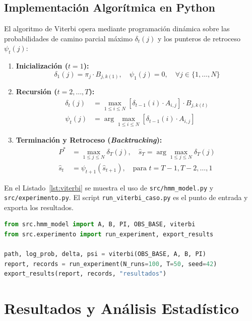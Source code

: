 \documentclass[11pt,a4paper]{article}
\begin{document}
\subsection{Implementación Algorítmica en Python}

El algoritmo de Viterbi opera mediante programación dinámica sobre las probabilidades de camino parcial máximo $\delta_t(j)$ y los punteros de retroceso $\psi_t(j)$:
\begin{enumerate}
    \item \textbf{Inicialización ($t = 1$):}
    \begin{equation}
    \delta_1(j) = \pi_j \cdot B_{j, k(1)}, \quad \psi_1(j) = 0, \quad \forall j \in \{1, \dots, N\}
    \end{equation}
    \item \textbf{Recursión ($t = 2, \dots, T$):}
    \begin{align}
    \delta_t(j) &= \max_{1 \le i \le N} \left[ \delta_{t-1}(i) \cdot A_{i,j} \right] \cdot B_{j, k(t)} \\
    \psi_t(j) &= \arg\max_{1 \le i \le N} \left[ \delta_{t-1}(i) \cdot A_{i,j} \right]
    \end{align}
    \item \textbf{Terminación y Retroceso (\textit{Backtracking}):}
    \begin{align}
    P^* &= \max_{1 \le j \le N} \delta_T(j), \quad \hat{s}_T = \arg\max_{1 \le j \le N} \delta_T(j) \\
    \hat{s}_t &= \psi_{t+1}(\hat{s}_{t+1}), \quad \text{para } t = T-1, T-2, \dots, 1
    \end{align}
\end{enumerate}

En el Listado~\ref{lst:viterbi} se muestra el uso de \texttt{src/hmm\_model.py} y \texttt{src/experimento.py}. El script \texttt{run\_viterbi\_caso.py} es el punto de entrada y exporta los resultados.

\begin{lstlisting}[language=Python, caption={Uso del núcleo y ejecución del experimento reproducible.}, label={lst:viterbi}]
from src.hmm_model import A, B, PI, OBS_BASE, viterbi
from src.experimento import run_experiment, export_results

path, log_prob, delta, psi = viterbi(OBS_BASE, A, B, PI)
report, records = run_experiment(N_runs=100, T=50, seed=42)
export_results(report, records, "resultados")
\end{lstlisting}

\section{Resultados y Análisis Estadístico}
\end{document}
